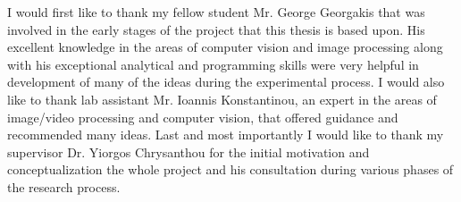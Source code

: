 \documentclass[a4paper,11pt]{report}
\begin{document}
\beforepreface %

\acknowledgement 
I would first like to thank my fellow student Mr. George Georgakis that was involved in the early stages of the project that this thesis is based upon. His excellent knowledge in the areas of computer vision and image processing along with his exceptional analytical and programming skills were very helpful in development of many of the ideas during the experimental process. 
I would also like to thank lab assistant Mr. Ioannis Konstantinou, an expert in the areas of image/video processing and computer vision, that offered guidance and recommended many ideas. 
Last and most importantly I would like to thank my supervisor Dr. Yiorgos Chrysanthou for the initial motivation and conceptualization the whole project and his consultation during various phases of the research process.


\afterpreface %











\postmatter
\end{document}
